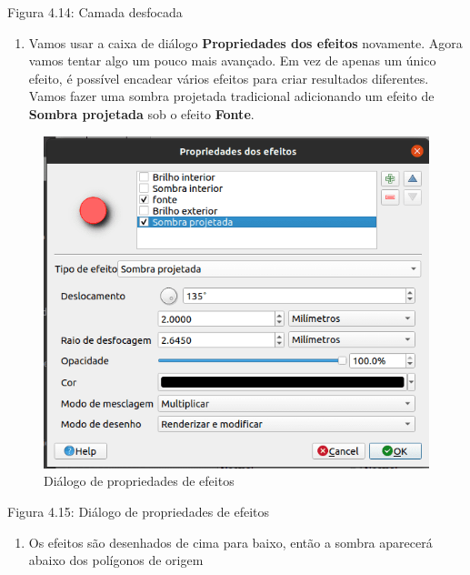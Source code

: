\documentclass[
]{krantz}
\providecommand{\tightlist}{%
  \setlength{\itemsep}{0pt}\setlength{\parskip}{0pt}}
\begin{document}
Figura 4.14: Camada desfocada

\begin{enumerate}
\def\labelenumi{\arabic{enumi}.}
\setcounter{enumi}{5}
\tightlist
\item
  Vamos usar a caixa de diálogo \textbf{Propriedades dos efeitos} novamente. Agora vamos tentar algo um pouco mais avançado. Em vez de apenas um único efeito, é possível encadear vários efeitos para criar resultados diferentes. Vamos fazer uma sombra projetada tradicional adicionando um efeito de \textbf{Sombra projetada} sob o efeito \textbf{Fonte}.
\end{enumerate}

\begin{figure}
\centering
\includegraphics{media/modulo4/drop-shadow.png}
\caption{Diálogo de propriedades de efeitos}
\end{figure}

Figura 4.15: Diálogo de propriedades de efeitos

\begin{enumerate}
\def\labelenumi{\arabic{enumi}.}
\setcounter{enumi}{6}
\tightlist
\item
  Os efeitos são desenhados de cima para baixo, então a sombra aparecerá abaixo dos polígonos de origem
\end{enumerate}
\end{document}
